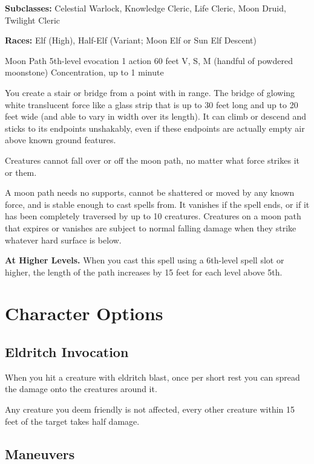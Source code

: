 \documentclass[letter,10pt,twocolumn,openany]{dndbook}
\begin{document}
\textbf{Subclasses:} Celestial Warlock, Knowledge Cleric, Life Cleric, Moon Druid, Twilight Cleric

\textbf{Races:} Elf (High), Half-Elf (Variant; Moon Elf or Sun Elf Descent)

\DndSpellHeader
  {Moon Path}
  {5th-level evocation}
  {1 action}
  {60 feet}
  {V, S, M (handful of powdered moonstone)}
  {Concentration, up to 1 minute}

You create a stair or bridge from a point with in range. The bridge of glowing white translucent force like a glass strip that is up to 30 feet long and up to 20 feet wide (and able to vary in width over its length). It can climb or descend and sticks to its endpoints unshakably, even if these endpoints are actually empty air above known ground features.

Creatures cannot fall over or off the moon path, no matter what force strikes it or them.

A moon path needs no supports, cannot be shattered or moved by any known force, and is stable enough to cast spells from. It vanishes if the spell ends, or if it has been completely traversed by up to 10 creatures. Creatures on a moon path that expires or vanishes are subject to normal falling damage when they strike whatever hard surface is below.

\textbf{At Higher Levels.} When you cast this spell using a 6th-level spell slot or higher, the length of the path increases by 15 feet for each level above 5th.

\chapter{Character Options}

\section{Eldritch Invocation}


When you hit a creature with eldritch blast, once per short rest you can spread the damage onto the creatures around it.

Any creature you deem friendly is not affected, every other creature within 15 feet of the target takes half damage.

\section{Maneuvers}
\end{document}
